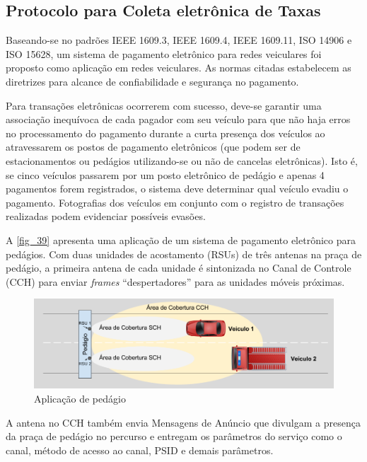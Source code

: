 \documentclass[
12pt,				%
openright,			%
oneside,			%
a4paper,			%
brazil,				%
]{abntex2}
\begin{document}
	\subsection{Protocolo para Coleta eletrônica de Taxas}

	\par Baseando-se no padrões IEEE 1609.3, IEEE 1609.4, IEEE 1609.11, ISO 14906 e ISO 15628, um sistema de pagamento eletrônico para redes veiculares foi proposto como aplicação em redes veiculares. As normas citadas estabelecem as diretrizes para alcance de confiabilidade e segurança no pagamento. 
	
	\par Para transações eletrônicas ocorrerem com sucesso, deve-se garantir uma associação inequívoca de cada pagador com seu veículo para que não haja erros no processamento do pagamento durante a curta presença dos veículos ao atravessarem os postos de pagamento eletrônicos (que podem ser de estacionamentos ou pedágios utilizando-se ou não de cancelas eletrônicas). Isto é, se cinco veículos passarem por um posto eletrônico de pedágio e apenas 4 pagamentos forem registrados, o sistema deve determinar qual veículo evadiu o pagamento. Fotografias dos veículos em conjunto com o registro de transações realizadas podem evidenciar possíveis evasões.
	
	\par A \autoref{fig_39} apresenta uma aplicação de um sistema de pagamento eletrônico para pedágios. Com duas unidades de acostamento (RSUs) de três antenas na praça de pedágio, a primeira antena de cada unidade é sintonizada no Canal de Controle (CCH) para enviar \textit{frames} “despertadores” para as unidades móveis próximas.
	
	\begin{figure} [H]
		\centering
		\includegraphics[scale=.4]{figuras/cap3/39AplicacaoPedagio}
		\caption{\label{fig_39}Aplicação de pedágio}
	\end{figure}
	
	\par A antena no CCH também envia Mensagens de Anúncio que divulgam a presença da praça de pedágio no percurso e entregam os parâmetros do serviço como o canal, método de acesso ao canal, PSID e demais parâmetros.
	
\end{document}
